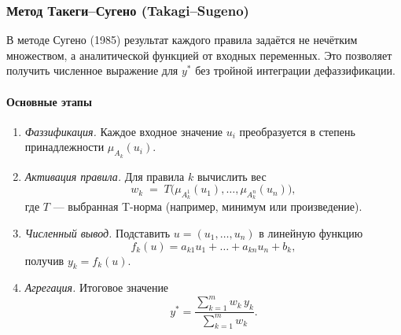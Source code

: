 \subsubsection{Метод Такеги–Сугено (Takagi–Sugeno)}
\label{subsubsec:sugeno}

В методе Сугено (1985) результат каждого правила задаётся не нечётким множеством, а аналитической функцией от входных переменных. Это позволяет получить численное выражение для $y^*$ без тройной интеграции дефаззификации.

\paragraph{Основные этапы}
\begin{enumerate}
  \item \emph{Фаззификация.} Каждое входное значение $u_i$ преобразуется в степень принадлежности $\mu_{A_k}(u_i)$.
  \item \emph{Активация правила.} Для правила $k$ вычислить вес
    \[
      w_k \;=\; T\bigl(\mu_{A_k^1}(u_1),\dots,\mu_{A_k^n}(u_n)\bigr),
    \]
    где $T$ — выбранная T-норма (например, минимум или произведение).
  \item \emph{Численный вывод.} Подставить $u=(u_1,\dots,u_n)$ в линейную функцию
    \[
      f_k(u) = a_{k1}u_1 + \dots + a_{kn}u_n + b_k,
    \]
    получив $y_k = f_k(u)$.
  \item \emph{Агрегация.} Итоговое значение
    \[
      y^* = \frac{\sum_{k=1}^m w_k\,y_k}{\sum_{k=1}^m w_k}.
    \]
\end{enumerate}

